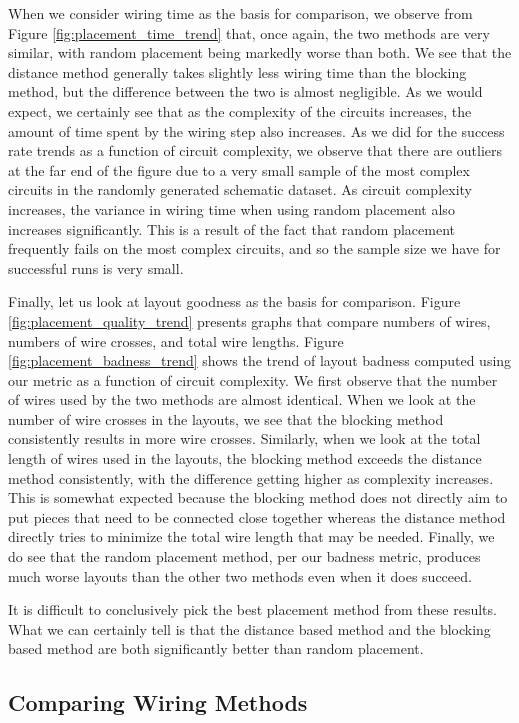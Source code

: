 When we consider wiring time as the basis for comparison, we observe from
Figure \ref{fig:placement_time_trend} that, once again, the two methods are
very similar, with random placement being markedly worse than both.
We see that the distance method generally takes slightly less
wiring time than the blocking method, but the difference between the two is
almost negligible. As we would expect, we certainly see that as the complexity
of the circuits increases, the amount of time spent by the wiring step also
increases. As we did for the success rate trends as a function of circuit
complexity, we observe that there are outliers at the far end of the figure due
to a very small sample of the most complex circuits in the randomly generated
schematic dataset. As circuit complexity increases, the variance in wiring time
when using random placement also increases significantly. This is a result of
the fact that random placement frequently fails on the most complex
circuits, and so the sample size we have for successful runs is very small.

Finally, let us look at layout goodness as the basis for comparison. Figure
\ref{fig:placement_quality_trend} presents graphs that compare numbers of wires,
numbers of wire crosses, and total wire lengths.
Figure \ref{fig:placement_badness_trend} shows the trend of layout badness
computed using our metric as a function of circuit complexity.
We first observe that the
number of wires used by the two methods are almost identical. When
we look at the number of wire crosses in the layouts, we
see that the blocking method consistently results in more wire crosses. Similarly,
when we look at the total length of wires used in the layouts, the blocking
method exceeds the distance method consistently, with the difference getting
higher as complexity increases.
This is somewhat expected because the blocking method does not directly aim to
put pieces that need to be connected close together whereas the distance method
directly tries to minimize the total wire length that may be needed.
Finally, we do see that the random
placement method, per our badness metric, produces much worse layouts than the
other two methods even when it does succeed.

It is difficult to conclusively pick the best placement method from these
results. What we can certainly tell is that the distance based method and the
blocking based method are both significantly better than random placement.

\subsection{Comparing Wiring Methods}

